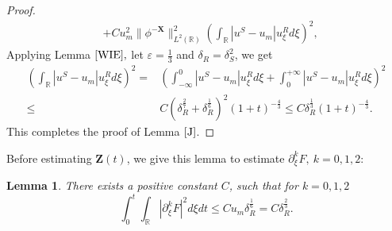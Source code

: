 \documentclass[10pt,reqno]{amsart}
\numberwithin{equation}{section}
\newtheorem{lemma}[theorem]{Lemma}
\begin{document}
\begin{proof}
\begin{equation}
\begin{aligned}
				&+Cu_m^2\lVert\phi^{-\mathbf{X}}\rVert_{L^{2}(\mathbb{R})}^2\left(\int_{\mathbb{R}}\left|u^S-u_m\right|u_{\xi}^Rd\xi\right)^2,
			\end{aligned}
		\end{equation}
		Applying Lemma $\ref{WIE},$ let $\varepsilon=\frac{1}{3}$ and $\delta_{R}=\delta_{S}^2$, we get
		\begin{equation}\label{J2}
			\begin{aligned}
				\left(\int_{\mathbb{R}}\left|u^S-u_m\right|u_{\xi}^Rd\xi\right)^2=&\left(\int_{-\infty}^0\left|u^S-u_m\right|u_{\xi}^Rd\xi+\int_{0}^{+\infty}\left|u^S-u_m\right|u_{\xi}^Rd\xi\right)^2\\
				\leq&C\left(\delta_{R}^{\frac{2}{7}}+\delta_R^{\frac{1}{6}}\right)^2(1+t)^{-\frac{4}{3}}
				\leq C\delta_{R}^{\frac{1}{3}}(1+t)^{-\frac{4}{3}}.
			\end{aligned}
		\end{equation}
		This completes the proof of Lemma $\ref{J}$. 
	\end{proof}
	Before estimating $\mathbf{Z}(t)$, we give this lemma to estimate $\partial_{\xi}^kF,\ k=0,1,2$:
	\begin{lemma}\label{lemf}
		There exists a positive constant $C$, such that for $k=0,1,2$
		\begin{equation}\label{kf}
			\int_0^t\int_{\mathbb{R}}\left|\partial_{\xi}^kF\right|^2d\xi dt\leq Cu_m\delta_R^{\frac{1}{6}}= C\delta_{R}^{\frac{2}{3}}.
		\end{equation}
	\end{lemma} 
\end{document}
